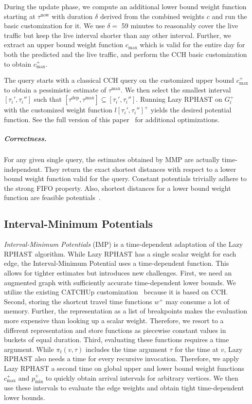 \documentclass[a4paper,UKenglish,cleveref, autoref, thm-restate]{lipics-v2021}
\newcommand*{\pred}{p}
\newcommand*{\comb}{c}
\newcommand*{\tdep}{\tau^{\operatorname{dep}}}
\newcommand*{\tnow}{\tau^{\operatorname{now}}}
\newcommand*{\tmax}{\tau^{\max}}
\begin{document}
During the update phase, we compute an additional lower bound weight function starting at $\tnow$ with duration $\delta$ derived from the combined weights $\comb$ and run the basic customization for it.
We use $\delta =$ 59 minutes to reasonably cover the live traffic but keep the live interval shorter than any other interval.
Further, we extract an upper bound weight function $\comb_{\max}$ which is valid for the entire day for both the predicted and the live traffic, and perform the CCH basic customization to obtain $\comb^+_{\max}$.

The query starts with a classical CCH query on the customized upper bound $\comb^+_{\max}$ to obtain a pessimistic estimate of $\tmax$.
We then select the smallest interval $[\tau_i', \tau_i'']$ such that $[\tdep,\tmax] \subseteq [\tau_i', \tau_i'']$.
Running Lazy RPHAST on $G^+_l$ with the customized weight function $l[\tau_i', \tau_i'']^+$ yields the desired potential function.
See the full version of this paper~\cite{wz-cplttdap-22} for additional optimizations.

\subparagraph{Correctness.}
For any given single query, the estimates obtained by MMP are actually time-independent.
They return the exact shortest distances with respect to a lower bound weight function valid for the query.
Constant potentials trivially adhere to the strong FIFO property.
Also, shortest distances for a lower bound weight function are feasible potentials~\cite{strasser_et_al:LIPIcs.SEA.2021.6}.

\subsection{Interval-Minimum Potentials}

\emph{Interval-Minimum Potentials} (IMP) is a time-dependent adaptation of the Lazy RPHAST algorithm.
While Lazy RPHAST has a single scalar weight for each edge, the Interval-Minimum Potential uses a time-dependent function.
This allows for tighter estimates but introduces new challenges.
First, we need an augmented graph with sufficiently accurate time-dependent lower bounds.
We utilize the existing CATCHUp customization~\cite{swz-sfert-21} because it is based on CCH.
Second, storing the shortcut travel time functions $w^+$ may consume a lot of memory.
Further, the representation as a list of breakpoints makes the evaluation more expensive than looking up a scalar weight.
Therefore, we resort to a different representation and store functions as piecewise constant values in buckets of equal duration.
Third, evaluating these functions requires a time argument.
While $\pi_t(v, \tau)$ includes the time argument $\tau$ for the time at $v$, Lazy RPHAST also needs a time for every recursive invocation.
Therefore, we apply Lazy RPHAST a second time on global upper and lower bound weight functions $\comb_{\max}^+$ and $\pred_{\min}^+$ to quickly obtain arrival intervals for arbitrary vertices.
We then use these intervals to evaluate the edge weights and obtain tight time-dependent lower bounds.
\end{document}
